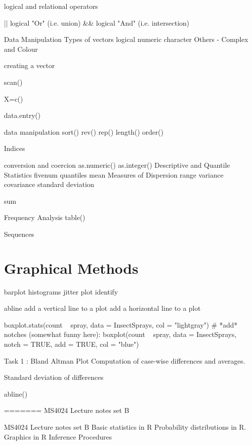 logical and relational operators
 
||      logical "Or"      (i.e.  union)
&&     logical "And"   (i.e. intersection)   

 



Data Manipulation
Types of vectors
	logical
	numeric
	character
    Others  - Complex and Colour

creating a vector

scan()

X=c()

data.entry()

data manipulation
sort()
rev()
rep()
length()
order()


Indices

 

 

 
conversion and coercion
as.numeric()
as.integer()
Descriptive and Quantile Statistics
fivenum
quantiles
mean
Measures of Dispersion
  range
  variance
  covariance
  standard deviation

sum

 
 

Frequency Analysis
table()
 
Sequences 
 



\section{Graphical Methods}

barplot
histograms
jitter
plot
identify

abline
add a vertical line to a plot
add a horizontal line to a plot
 
boxplot.stats(count ~ spray, data = InsectSprays, col = "lightgray")
# *add* notches (somewhat funny here):
boxplot(count ~ spray, data = InsectSprays,        notch = TRUE, add = TRUE, col = "blue")



 
Task 1 : Bland Altman Plot
Computation of case-wise differences and averages.
 
Standard deviation of differences
 
abline()
 
 

 
=======
MS4024 Lecture notes set B

MS4024 Lecture notes set B
Basic statistics in R
Probability distributions in R.
Graphics in R
Inference Procedures
 

